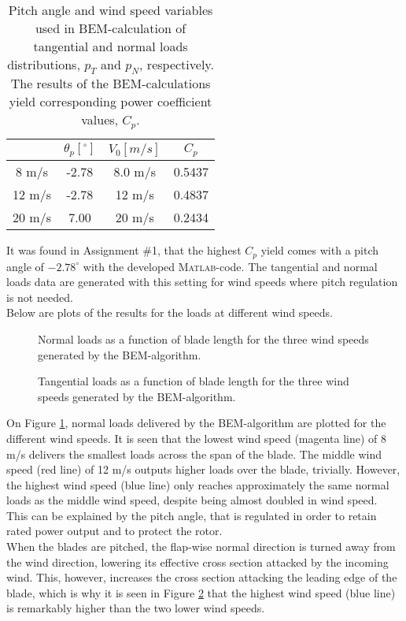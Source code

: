 \begin{table}[H]
\centering
	\begin{tabular}{c|c c c }
	  & $\theta_p [^\circ]$ & $V_0 [m/s]$ & $C_p$ \\ 
	\hline 
	8 m/s & -2.78 & 8.0 m/s & 0.5437 \\ 
	\hline 
	12 m/s & -2.78 & 12 m/s & 0.4837 \\ 
	\hline 
	20 m/s & 7.00 & 20 m/s & 0.2434 \\ 
	\hline 
	\end{tabular} 
	\caption{\small{Pitch angle and wind speed variables used in BEM-calculation of tangential and normal loads distributions, $p_T$ and $p_N$, respectively. The results of the BEM-calculations yield corresponding power coefficient values, $C_p$.}}
\end{table}

It was found in Assignment \#1, that the highest $C_p$ yield comes with a pitch angle of $-2.78^{\circ}$ with the developed \textsc{Matlab}-code. The tangential and normal loads data are generated with this setting for wind speeds where pitch regulation is not needed. \\
Below are plots of the results for the loads at different wind speeds.

\setlength\figureheight{5cm}
\setlength\figurewidth{13cm}
\begin{figure}[H]
	\hspace*{-1.8cm}
	\centering
	
	\caption{\small{Normal loads as a function of blade length for the three wind speeds generated by the BEM-algorithm.}}
	\label{q2_nload}
\end{figure}

\setlength\figureheight{5cm}
\setlength\figurewidth{13cm}
\begin{figure}[H]
	\hspace*{-1.8cm}
	\centering
	
	\caption{\small{Tangential loads as a function of blade length for the three wind speeds generated by the BEM-algorithm.}}
	\label{q2_tload}
\end{figure}
\newpage
On Figure \ref{q2_nload}, normal loads delivered by the BEM-algorithm are plotted for the different wind speeds. It is seen that the lowest wind speed (magenta line) of 8 m/s delivers the smallest loads across the span of the blade. The middle wind speed (red line) of 12 m/s outputs higher loads over the blade, trivially. However, the highest wind speed (blue line) only reaches approximately the same normal loads as the middle wind speed, despite being almost doubled in wind speed. \\
This can be explained by the pitch angle, that is regulated in order to retain rated power output and to protect the rotor. \\
When the blades are pitched, the flap-wise normal direction is turned away from the wind direction, lowering its effective cross section attacked by the incoming wind. This, however, increases the cross section attacking the leading edge of the blade, which is why it is seen in Figure \ref{q2_tload} that the highest wind speed (blue line) is remarkably higher than the two lower wind speeds.


